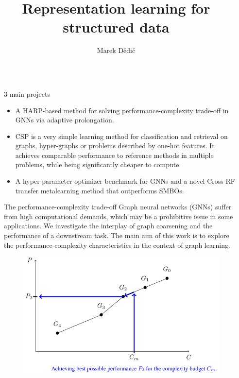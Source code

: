 \documentclass{beamer}
\title{Representation learning for structured data}
\author{%
	Marek Dědič\inst{1 2}
}
\institute{%
	\inst{1} Czech Technical University in Prague \samelineand
	\inst{2} Cisco Systems, Inc.
}
\newlength{\sepwidth}
\newlength{\colwidth}
\newcommand{\separatorcolumn}{\begin{column}{\sepwidth}\end{column}}
\begin{document}
\begin{frame}[fragile,t]

\begin{columns}[t]
	\separatorcolumn

	\begin{column}{\colwidth}
		\begin{alertblock}{3 main projects}
			\begin{itemize}
				\item A HARP-based method for solving performance-complexity trade-off in GNNs via adaptive prolongation.
				\item CSP is a very simple learning method for classification and retrieval on graphs, hyper-graphs or problems described by one-hot features. It achieves comparable performance to reference methods in multiple problems, while being significantly cheaper to compute.
				\item A hyper-parameter optimizer benchmark for GNNs and a novel Cross-RF transfer metalearning method that outperforms SMBOs.
			\end{itemize}
		\end{alertblock}

		\begin{block}{The performance-complexity trade-off}
			Graph neural networks (GNNs) suffer from high computational demands, which may be a prohibitive issue in some applications. We investigate the interplay of graph coarsening and the performance of a downstream task. The main aim of this work is to explore the performance-complexity characteristics in the context of graph learning.
			\begin{figure}
				\includegraphics[width=0.7\linewidth]{images/performance-complexity/performance-complexity.pdf}
			\end{figure}
		\end{block}


\end{column}
\end{columns}
\end{frame}
\end{document}
